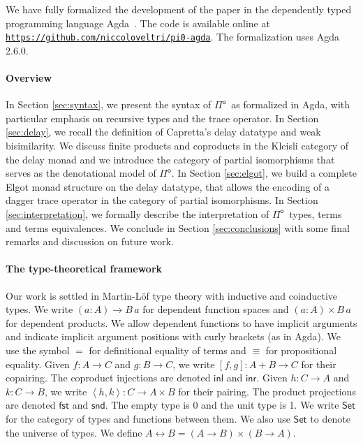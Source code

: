 \documentclass[runningheads,a4paper]{llncs}
\newcommand{\Pio}{\ensuremath{\mathsf{\Pi}^{\mathsf{o}}}}
\newcommand{\Set}{\mathsf{Set}}
\newcommand{\copair}[2]{[#1,#2]}
\newcommand{\pair}[2]{\left< #1,#2 \right>}
\newcommand{\inl}{\mathsf{inl}}
\newcommand{\inr}{\mathsf{inr}}
\newcommand{\fst}{\mathsf{fst}}
\newcommand{\snd}{\mathsf{snd}}
\begin{document}
We have fully formalized the development of the paper in the
dependently typed programming language Agda~\cite{Agda}. The code is
available online at \\ \texttt{\url{https://github.com/niccoloveltri/pi0-agda}}. The
formalization uses Agda 2.6.0.

\paragraph{Overview}
In Section \ref{sec:syntax}, we present the syntax of \Pio\ as
formalized in Agda, with particular emphasis on recursive types and
the trace operator. In Section \ref{sec:delay}, we recall the
definition of Capretta's delay datatype and weak bisimilarity. We
discuss finite products and coproducts in the Kleisli category of the
delay monad and we introduce the category of partial isomorphisms that
serves as the denotational model of \Pio. In Section
\ref{sec:elgot}, we build a complete Elgot monad structure on the delay
datatype, that allows the encoding of a dagger trace operator in the
category of partial isomorphisms. In Section \ref{sec:interpretation},
we formally describe the interpretation of \Pio\ types, terms and
terms equivalences. We conclude in Section \ref{sec:conclusions} with
some final remarks and discussion on future work.

\paragraph{The type-theoretical framework}

Our work is settled in Martin-L\"of type theory with inductive and
coinductive types. We write $(a : A) \to B \,a$ for dependent function
spaces and $(a : A) \times B \,a$ for dependent products. We allow
dependent functions to have implicit arguments and indicate implicit
argument positions with curly brackets (as in Agda). We use the
symbol $=$ for definitional equality of terms and $\equiv$ for
propositional equality. Given $f : A \to C$ and
$g : B \to C$, we write $\copair f g : A + B \to C$ for their
copairing. The coproduct injections are denoted $\inl$ and $\inr$.
Given $h : C \to A$ and $k : C \to B$, we write
$\pair h k : C \to A \times B$ for their pairing. The product
projections are denoted $\fst$ and $\snd$. The empty type is 0 and the
unit type is 1. We write $\Set$ for the category of
types and functions between them. We also use $\Set$ to denote the
universe of types.
We define $A \leftrightarrow B = (A \to B) \times (B \to A)$.
\end{document}
